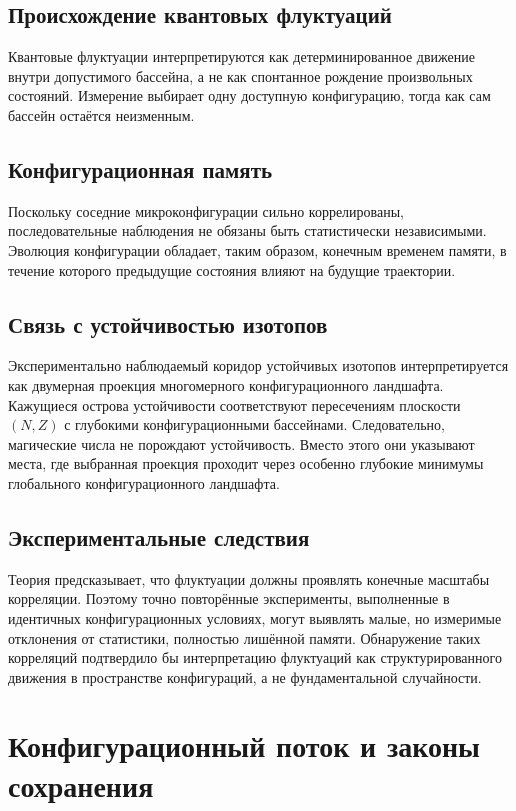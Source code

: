 \section{Происхождение квантовых флуктуаций}

Квантовые флуктуации интерпретируются как детерминированное движение внутри допустимого бассейна, а не как спонтанное рождение произвольных состояний. Измерение выбирает одну доступную конфигурацию, тогда как сам бассейн остаётся неизменным.

\section{Конфигурационная память}

Поскольку соседние микроконфигурации сильно коррелированы, последовательные наблюдения не обязаны быть статистически независимыми. Эволюция конфигурации обладает, таким образом, конечным временем памяти, в течение которого предыдущие состояния влияют на будущие траектории.

\section{Связь с устойчивостью изотопов}

Экспериментально наблюдаемый коридор устойчивых изотопов интерпретируется как двумерная проекция многомерного конфигурационного ландшафта. Кажущиеся острова устойчивости соответствуют пересечениям плоскости \((N,Z)\) с глубокими конфигурационными бассейнами. Следовательно, магические числа не порождают устойчивость. Вместо этого они указывают места, где выбранная проекция проходит через особенно глубокие минимумы глобального конфигурационного ландшафта.

\section{Экспериментальные следствия}

Теория предсказывает, что флуктуации должны проявлять конечные масштабы корреляции. Поэтому точно повторённые эксперименты, выполненные в идентичных конфигурационных условиях, могут выявлять малые, но измеримые отклонения от статистики, полностью лишённой памяти. Обнаружение таких корреляций подтвердило бы интерпретацию флуктуаций как структурированного движения в пространстве конфигураций, а не фундаментальной случайности.

\chapter{Конфигурационный поток и законы сохранения}

